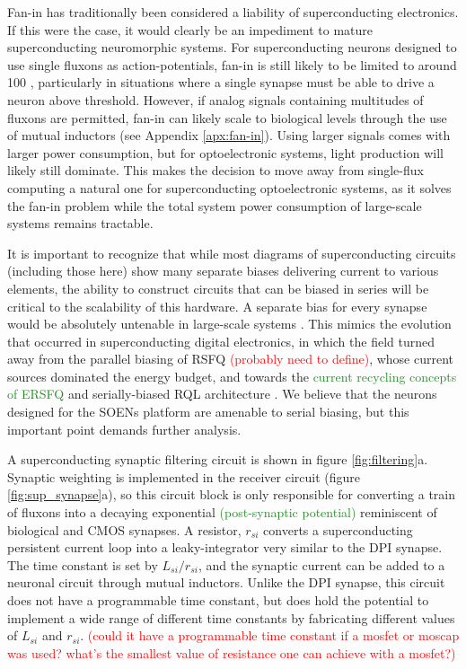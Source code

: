 \documentclass[twocolumn]{article}
\begin{document}
Fan-in has traditionally been considered a liability of superconducting electronics. If this were the case, it would clearly be an impediment to mature superconducting neuromorphic systems. For superconducting neurons designed to use single fluxons as action-potentials, fan-in is still likely to be limited to around 100 \cite{schneider2020fan}, particularly in situations where a single synapse must be able to drive a neuron above threshold. However, if analog signals containing multitudes of fluxons are permitted, fan-in can likely scale to biological levels through the use of mutual inductors (see Appendix \ref{apx:fan-in}). Using larger signals comes with larger power consumption, but for optoelectronic systems, light production will likely still dominate. This makes the decision to move away from single-flux computing a natural one for superconducting optoelectronic systems, as it solves the fan-in problem while the total system power consumption of large-scale systems remains tractable.

It is important to recognize that while most diagrams of superconducting circuits (including those here) show many separate biases delivering current to various elements, the ability to construct circuits that can be biased in series will be critical to the scalability of this hardware. A separate bias for every synapse would be absolutely untenable in large-scale systems \cite{sergey}. This mimics the evolution that occurred in superconducting digital electronics, in which the field turned away from the parallel biasing of RSFQ \textcolor{red}{(probably need to define)}, whose current sources dominated the energy budget, and towards the \textcolor{ForestGreen}{current recycling concepts of ERSFQ \cite{}} and serially-biased RQL architecture \cite{tolpygo2016superconductor}. We believe that the neurons designed for the SOENs platform are amenable to serial biasing, but this important point demands further analysis.

A superconducting synaptic filtering circuit is shown in figure \ref{fig:filtering}a. Synaptic weighting is implemented in the receiver circuit (figure \ref{fig:sup_synapse}a), so this circuit block is only responsible for converting a train of fluxons into a decaying exponential \textcolor{ForestGreen}{(post-synaptic potential)} reminiscent of biological and CMOS synapses. A resistor, $r_{si}$ converts a superconducting persistent current loop into a leaky-integrator very similar to the DPI synapse. The time constant is set by $L_{si}/r_{si}$, and the synaptic current can be added to a neuronal circuit through mutual inductors. Unlike the DPI synapse, this circuit does not have a programmable time constant, but does hold the potential to implement a wide range of different time constants by fabricating different values of $L_{si}$ and $r_{si}$. \textcolor{red}{(could it have a programmable time constant if a mosfet or moscap was used? what's the smallest value of resistance one can achieve with a mosfet?)}
\end{document}
